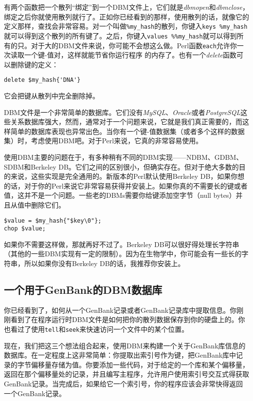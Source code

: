 有两个函数把一个散列“绑定”到一个DBM文件上，它们就是\textit{dbmopen}和\textit{dbmclose}，绑定之后你就使用散列就行了。正如你已经看到的那样，使用散列的话，就像它的定义那样，查找会非常容易。对一个叫做\verb|%my_hash|的散列，你键入\verb|keys %my_hash|就可以得到这个散列的所有键了。之后，你键入\verb|values %%my_hash|就可以得到所有的只。对于大的DBM文件来说，你可能不会想这么做。Perl函数\verb|each|允许你一次读取一个键-值对，这样就能节省你运行程序 的内存了。也有一个\textit{delete}函数可以删除键的定义：

\begin{lstlisting}
delete $my_hash{'DNA'}
\end{lstlisting}

它会把键从散列中完全删除掉。

DBM文件是一个非常简单的数据库。它们没有\textit{MySQL}、\textit{Oracle}或者\textit{PostgreSQL}这些关系数据库强大，然而，通常对于一个问题来说，它就是我们真正需要的，而这样简单的数据库表现也异常出色。当你有一个键-值数据集（或者多个这样的数据集）时，考虑使用DBM吧。对于Perl来说，它真的非常容易使用。

使用DBM主要的问题在于，有多种稍有不同的DBM实现——NDBM、GDBM、SDBM和Berkeley DB。它们之间的区别很小，但确实存在。但对于绝大多数的目的来说，这些实现是完全通用的。新版本的Perl默认使用Berkeley DB，如果你想的话，对于你的Perl来说它非常容易获得并安装上。如果你真的不需要长的键或者值，这并不是一个问题。一些老的DBMs需要你给键添加空字节（null bytes）并且从值中删除它们。

\begin{lstlisting}
$value = $my_hash{"$key\0"};
chop $value;
\end{lstlisting}

如果你不需要这样做，那就再好不过了。Berkeley DB可以很好得处理长字符串（其他的一些DBM实现有一定的限制）。因为在生物学中，你可能会有一些长的字符串，所以如果你没有Berkeley DB的话，我推荐你安装上。

\subsection{一个用于GenBank的DBM数据库}
你已经看到了，如何从一个GenBank记录或者GenBank记录库中提取信息。你刚刚看到了在程序运行时DBM文件是如何把你的散列数据保存到你的硬盘上的。你也看过了使用\verb|tell|和\verb|seek|来快速访问一个文件中的某个位置。

现在，我们把这三个想法组合起来，使用DBM来构建一个关于GenBank库信息的数据库。在一定程度上这非常简单：你提取出索引号作为键，把GenBank库中记录的字节偏移量存储为值。你要添加一些代码，对于给定的一个库和某个偏移量，返回在那个偏移量处的记录，并且编写主程序，允许用户使用索引号交互式得获取GenBank记录。当完成后，如果给它一个索引号，你的程序应该会非常快得返回一个GenBank记录。

